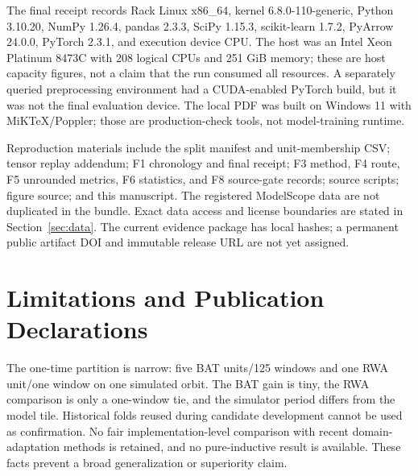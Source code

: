 \documentclass[journal]{IEEEtran}
\begin{document}
The final receipt records Rack Linux x86\_64, kernel 6.8.0-110-generic, Python 3.10.20, NumPy 1.26.4, pandas 2.3.3, SciPy 1.15.3, scikit-learn 1.7.2, PyArrow 24.0.0, PyTorch 2.3.1, and execution device CPU. The host was an Intel Xeon Platinum 8473C with 208 logical CPUs and 251 GiB memory; these are host capacity figures, not a claim that the run consumed all resources. A separately queried preprocessing environment had a CUDA-enabled PyTorch build, but it was not the final evaluation device. The local PDF was built on Windows 11 with MiKTeX/Poppler; those are production-check tools, not model-training runtime.

Reproduction materials include the split manifest and unit-membership CSV; tensor replay addendum; F1 chronology and final receipt; F3 method, F4 route, F5 unrounded metrics, F6 statistics, and F8 source-gate records; source scripts; figure source; and this manuscript. The registered ModelScope data are not duplicated in the bundle. Exact data access and license boundaries are stated in Section~\ref{sec:data}. The current evidence package has local hashes; a permanent public artifact DOI and immutable release URL are not yet assigned.

\section{Limitations and Publication Declarations}
The one-time partition is narrow: five BAT units/125 windows and one RWA unit/one window on one simulated orbit. The BAT gain is tiny, the RWA comparison is only a one-window tie, and the simulator period differs from the model tile. Historical folds reused during candidate development cannot be used as confirmation. No fair implementation-level comparison with recent domain-adaptation methods is retained, and no pure-inductive result is available. These facts prevent a broad generalization or superiority claim.
\end{document}
